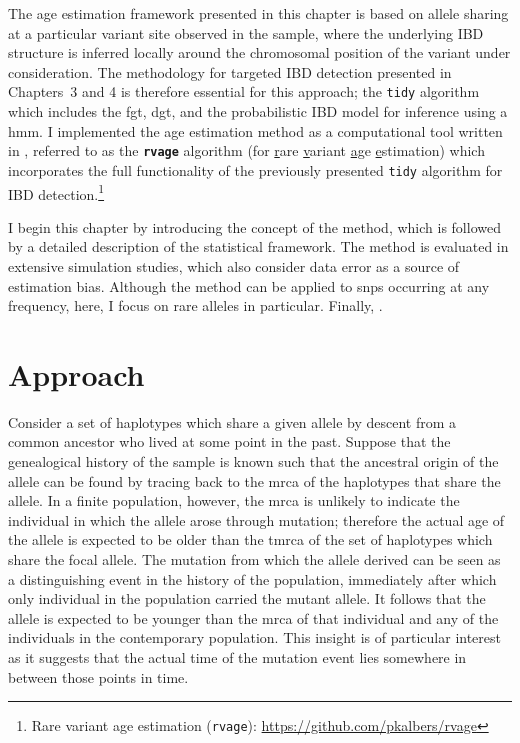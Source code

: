 The age estimation framework presented in this chapter is based on allele sharing at a particular variant site observed in the sample, where the underlying IBD structure is inferred locally around the chromosomal position of the variant under consideration.
The methodology for targeted IBD detection presented in Chapters~3 and 4 is therefore essential for this approach; \ie the \texttt{tidy} algorithm which includes the \gls{fgt}, \gls{dgt}, and the probabilistic IBD model for inference using a \gls{hmm}.
I implemented the age estimation method as a computational tool written in \cpp, referred to as the \textbf{\texttt{rvage}} algorithm (for \underline{r}are \underline{v}ariant \underline{a}\underline{g}e \underline{e}stimation) which incorporates the full functionality of the previously presented \texttt{tidy} algorithm for IBD detection.\footnote{Rare variant age estimation (\texttt{rvage}): \url{https://github.com/pkalbers/rvage}}

I begin this chapter by introducing the concept of the method, which is followed by a detailed description of the statistical framework.
The method is evaluated in extensive simulation studies, which also consider data error as a source of estimation bias.
Although the method can be applied to \glspl{snp} occurring at any frequency, here, I focus on rare alleles in particular.
Finally, .



%
\section{Approach}
%

Consider a set of haplotypes which share a given allele by descent from a common ancestor who lived at some point in the past.
Suppose that the genealogical history of the sample is known such that the ancestral origin of the allele can be found by tracing back to the \gls{mrca} of the haplotypes that share the allele.
In a finite population, however, the \gls{mrca} is unlikely to indicate the individual in which the allele arose through mutation; therefore the actual age of the allele is expected to be older than the \gls{tmrca} of the set of haplotypes which share the focal allele.
The mutation from which the allele derived can be seen as a distinguishing event in the history of the population, immediately after which only  individual in the population carried the mutant allele.
It follows that the allele is expected to be younger than the \gls{mrca} of that  individual and any of the  individuals in the contemporary population.
This insight is of particular interest as it suggests that the actual time of the mutation event lies somewhere in between those  points in time.

